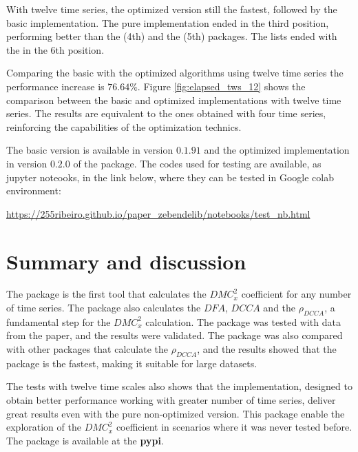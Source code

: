 \documentclass[nojss]{jss}
\begin{document}
With twelve time series, the optimized  version still the fastest, followed by the basic  implementation. The  pure  implementation ended in the third position, performing better than the  (4th) and the  (5th) packages. The lists ended with the  in the 6th position.

Comparing the basic with the optimized  algorithms using twelve time series the performance increase is $76.64\%$. Figure \ref{fig:elapsed_tws_12} shows the comparison between the basic and optimized  implementations with twelve time series. The results are equivalent to the ones obtained with four time series, reinforcing the capabilities of the optimization technics.

The basic version is available in  version $0.1.91$ and the optimized implementation in version $0.2.0$ of the package. The codes used for testing are available, as jupyter noteooks, in the link below, where they can be tested in Google colab environment:

\begin{center}
  \url{https://255ribeiro.github.io/paper_zebendelib/notebooks/test_nb.html}
\end{center}

\section{Summary and discussion} \label{sec:summary}

The  package is the first tool that calculates the $DMC_{x}^{2}$ coefficient for any number of time series. The package also calculates the $DFA$, $DCCA$ and the $\rho_{DCCA}$, a fundamental step for the $DMC_{x}^{2}$ calculation. The package was tested with data from the \cite{RIBEIRO2025107419} paper, and the results were validated. The package was also compared with other packages that calculate the $\rho_{DCCA}$, and the results showed that the  package is the fastest, making it suitable for large datasets.

The tests with twelve time scales also shows that the  implementation, designed to obtain better performance working with greater number of time series, deliver great results even with the pure  non-optimized version. This package enable the exploration of the $DMC_x^2$ coefficient in scenarios where it was never tested before. The package is available at the \textbf{pypi}.
\end{document}
